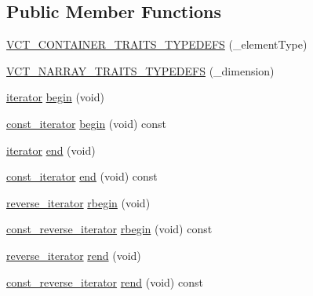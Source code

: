 \subsection*{Public Member Functions}
\begin{DoxyCompactItemize}
\item 
\hyperlink{classvct_dynamic_n_array_base_a914e933344f1f11d53ed819fb461c31f}{V\+C\+T\+\_\+\+C\+O\+N\+T\+A\+I\+N\+E\+R\+\_\+\+T\+R\+A\+I\+T\+S\+\_\+\+T\+Y\+P\+E\+D\+E\+F\+S} (\+\_\+element\+Type)
\item 
\hyperlink{classvct_dynamic_n_array_base_afd57de1af04b811a8f933667cf6bcd1b}{V\+C\+T\+\_\+\+N\+A\+R\+R\+A\+Y\+\_\+\+T\+R\+A\+I\+T\+S\+\_\+\+T\+Y\+P\+E\+D\+E\+F\+S} (\+\_\+dimension)
\item 
\hyperlink{classvct_dynamic_const_n_array_base_a0d7eee16dd05c2f5757640b3617cac5d}{iterator} \hyperlink{classvct_dynamic_n_array_base_a67f87d7c8b8de55f6d8c37cdb8c34616}{begin} (void)
\item 
\hyperlink{classvct_dynamic_const_n_array_base_a026881a1dc4be02626681c9c3056395b}{const\+\_\+iterator} \hyperlink{classvct_dynamic_n_array_base_a5e9bde5e66cfd5bb70ef14537e376b19}{begin} (void) const 
\item 
\hyperlink{classvct_dynamic_const_n_array_base_a0d7eee16dd05c2f5757640b3617cac5d}{iterator} \hyperlink{classvct_dynamic_n_array_base_a4449d8a38f5e620ee46bfdba4060a082}{end} (void)
\item 
\hyperlink{classvct_dynamic_const_n_array_base_a026881a1dc4be02626681c9c3056395b}{const\+\_\+iterator} \hyperlink{classvct_dynamic_n_array_base_af542ceb44a6df89eb0de59b6d1732a8a}{end} (void) const 
\item 
\hyperlink{classvct_dynamic_const_n_array_base_a028c350d6f74e002681cce4239dfdbc1}{reverse\+\_\+iterator} \hyperlink{classvct_dynamic_n_array_base_a1ff2b8db84927dc666d7e32e7ec9655e}{rbegin} (void)
\item 
\hyperlink{classvct_dynamic_const_n_array_base_a133cecf87f369296ad391ce3b697466b}{const\+\_\+reverse\+\_\+iterator} \hyperlink{classvct_dynamic_n_array_base_a25741a40be81855d110fc69e3794ba1d}{rbegin} (void) const 
\item 
\hyperlink{classvct_dynamic_const_n_array_base_a028c350d6f74e002681cce4239dfdbc1}{reverse\+\_\+iterator} \hyperlink{classvct_dynamic_n_array_base_a9ed53b7ec6842751b1a2ab00a1e1f240}{rend} (void)
\item 
\hyperlink{classvct_dynamic_const_n_array_base_a133cecf87f369296ad391ce3b697466b}{const\+\_\+reverse\+\_\+iterator} \hyperlink{classvct_dynamic_n_array_base_a48c84cbc9eb62b8323e1218ff657d3d7}{rend} (void) const 

\end{DoxyCompactItemize}
